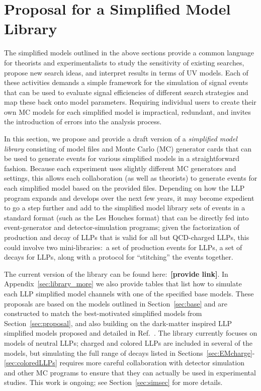 \section{Proposal for a Simplified Model Library}\label{sec:library}

The simplified models outlined in the above sections provide a common language for theorists and experimentalists to study the sensitivity of existing searches, propose new search ideas, and interpret results in terms of UV models. Each of these activities demands a simple framework for the simulation of signal events that can be used to evaluate signal efficiencies of different search strategies and map these back onto model parameters. Requiring individual users to create their own MC models for each simplified model is impractical, redundant, and invites the introduction of errors into the analysis process.

In this section, we propose and provide a draft version of a \emph{simplified model library} consisting of model files and Monte Carlo (MC) generator cards that can be used to generate events for various simplified models in a straightforward fashion. Because each experiment uses slightly different MC generators and settings, this allows each collaboration (as well as theorists) to generate events for each simplified model based on the provided files. Depending on how the LLP program expands and develops over the next few years, it may become expedient to go a step further and add to the simplified model library sets of events in a standard format (such as the Les Houches format) that can be directly fed into event-generator and detector-simulation programs; given the factorization of production and decay of LLPs that is valid for all but QCD-charged LLPs, this could involve two mini-libraries:~a set of production events for LLPs, a set of decays for LLPs, along with a protocol for ``stitching'' the events together.

The current version of the library can be found here:~{\bf [provide link]}. In Appendix~\ref{sec:library_more} we also provide tables that list how to simulate each LLP simplified model channels with one of the specified base models. These proposals are based on the models outlined in Section~\ref{sec:base} and are constructed to match the best-motivated simplified models from Section~\ref{sec:proposal}, and also building on the dark-matter inspired LLP simplified models proposed and detailed in Ref.~\cite{Buchmueller:2017uqu}.  The library currently focuses on models of neutral LLPs; charged and colored LLPs are included in several of the models, but  simulating the full range of decays listed in Sections~\ref{sec:EMcharge}-\ref{sec:coloredLLPs} requires more careful collaboration with detector simulation and other MC programs to ensure that they can actually be used in experimental studies. This work is ongoing; see Section~\ref{sec:simsec} for more details.

